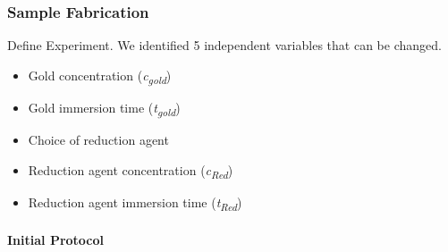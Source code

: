 \subsubsection{Sample Fabrication}

Define Experiment. We identified 5 independent variables that can be changed.


\begin{multicols}{2}
\begin{itemize}
    \item Gold concentration (\textit{c\textsubscript{gold}})
    \item Gold immersion time (\textit{t\textsubscript{gold}})
    \item Choice of reduction agent
    \item Reduction agent concentration (\textit{c\textsubscript{Red}})
    \item Reduction agent immersion time (\textit{t\textsubscript{Red}})
\end{itemize}
\end{multicols}




\paragraph{Initial Protocol}


